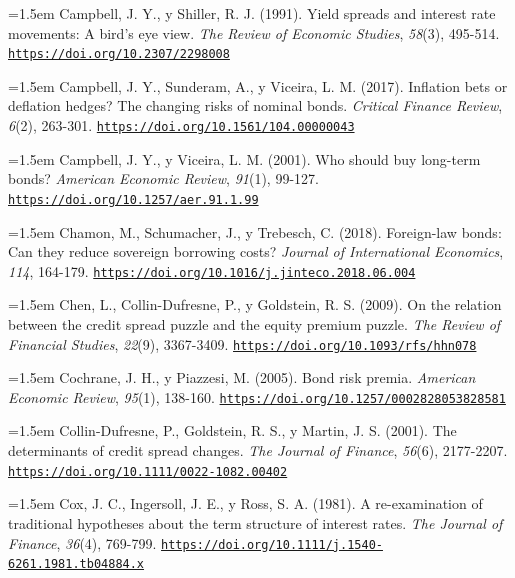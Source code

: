 \documentclass[10pt,a4paper]{article}
\begin{document}
\noindent\hangindent=1.5em Campbell, J. Y., y Shiller, R. J. (1991). Yield spreads and interest rate movements: A bird's eye view. \textit{The Review of Economic Studies}, \textit{58}(3), 495-514. \href{https://doi.org/10.2307/2298008}{\nolinkurl{https://doi.org/10.2307/2298008}}

\noindent\hangindent=1.5em Campbell, J. Y., Sunderam, A., y Viceira, L. M. (2017). Inflation bets or deflation hedges? The changing risks of nominal bonds. \textit{Critical Finance Review}, \textit{6}(2), 263-301. \href{https://doi.org/10.1561/104.00000043}{\nolinkurl{https://doi.org/10.1561/104.00000043}}

\noindent\hangindent=1.5em Campbell, J. Y., y Viceira, L. M. (2001). Who should buy long-term bonds? \textit{American Economic Review}, \textit{91}(1), 99-127. \href{https://doi.org/10.1257/aer.91.1.99}{\nolinkurl{https://doi.org/10.1257/aer.91.1.99}}

\noindent\hangindent=1.5em Chamon, M., Schumacher, J., y Trebesch, C. (2018). Foreign-law bonds: Can they reduce sovereign borrowing costs? \textit{Journal of International Economics}, \textit{114}, 164-179. \href{https://doi.org/10.1016/j.jinteco.2018.06.004}{\nolinkurl{https://doi.org/10.1016/j.jinteco.2018.06.004}}

\noindent\hangindent=1.5em Chen, L., Collin-Dufresne, P., y Goldstein, R. S. (2009). On the relation between the credit spread puzzle and the equity premium puzzle. \textit{The Review of Financial Studies}, \textit{22}(9), 3367-3409. \href{https://doi.org/10.1093/rfs/hhn078}{\nolinkurl{https://doi.org/10.1093/rfs/hhn078}}

\noindent\hangindent=1.5em Cochrane, J. H., y Piazzesi, M. (2005). Bond risk premia. \textit{American Economic Review}, \textit{95}(1), 138-160. \href{https://doi.org/10.1257/0002828053828581}{\nolinkurl{https://doi.org/10.1257/0002828053828581}}

\noindent\hangindent=1.5em Collin-Dufresne, P., Goldstein, R. S., y Martin, J. S. (2001). The determinants of credit spread changes. \textit{The Journal of Finance}, \textit{56}(6), 2177-2207. \href{https://doi.org/10.1111/0022-1082.00402}{\nolinkurl{https://doi.org/10.1111/0022-1082.00402}}

\noindent\hangindent=1.5em Cox, J. C., Ingersoll, J. E., y Ross, S. A. (1981). A re-examination of traditional hypotheses about the term structure of interest rates. \textit{The Journal of Finance}, \textit{36}(4), 769-799. \href{https://doi.org/10.1111/j.1540-6261.1981.tb04884.x}{\nolinkurl{https://doi.org/10.1111/j.1540-6261.1981.tb04884.x}}
\end{document}
